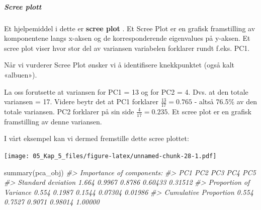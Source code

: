 \documentclass[
]{article}
\newenvironment{Shaded}{\begin{snugshade}}{\end{snugshade}}
\newcommand{\AttributeTok}[1]{\textcolor[rgb]{0.77,0.63,0.00}{#1}}
\newcommand{\CommentTok}[1]{\textcolor[rgb]{0.56,0.35,0.01}{\textit{#1}}}
\newcommand{\DecValTok}[1]{\textcolor[rgb]{0.00,0.00,0.81}{#1}}
\newcommand{\FunctionTok}[1]{\textcolor[rgb]{0.00,0.00,0.00}{#1}}
\newcommand{\NormalTok}[1]{#1}
\newcommand{\OtherTok}[1]{\textcolor[rgb]{0.56,0.35,0.01}{#1}}
\newcommand{\SpecialCharTok}[1]{\textcolor[rgb]{0.00,0.00,0.00}{#1}}
\newcommand{\StringTok}[1]{\textcolor[rgb]{0.31,0.60,0.02}{#1}}
\begin{document}
\hypertarget{scree-plott}{%
\subparagraph{Scree plott}\label{scree-plott}}

Et hjelpemiddel i dette er \textbf{scree plot} \citep{cattellScreeTestNumber1966}. Et Scree Plot er en grafisk framstilling av komponentene langs x-aksen og de korresponderende eigenvalues på y-aksen. Et scree plot viser hvor stor del av variansen variabelen forklarer rundt f.eks. PC1.

Når vi vurderer Scree Plot ønsker vi å identifisere knekkpunktet (også kalt «albuen»).

La oss forutsette at variansen for PC1 = 13 og for PC2 = 4. Dvs. at den totale variansen = 17. Videre beytr det at PC1 forklarer \(\frac{13}{17}=0.765\) - altså 76.5\% av den totale variansen. PC2 forklarer på sin side \(\frac{4}{17}=0.235\). Et scree plot er en grafisk framstilling av denne variansen.

I vårt eksempel kan vi dermed fremstille dette scree plottet:

\begin{Shaded}
\end{Shaded}

\texttt{[image: 05\_Kap\_5\_files/figure-latex/unnamed-chunk-28-1.pdf]}

\begin{Shaded}
\begin{Highlighting}[]
\FunctionTok{summary}\NormalTok{(pca\_obj)}
\CommentTok{\#\textgreater{} Importance of components:}
\CommentTok{\#\textgreater{}                          PC1    PC2    PC3     PC4     PC5}
\CommentTok{\#\textgreater{} Standard deviation     1.664 0.9967 0.8786 0.60433 0.31512}
\CommentTok{\#\textgreater{} Proportion of Variance 0.554 0.1987 0.1544 0.07304 0.01986}
\CommentTok{\#\textgreater{} Cumulative Proportion  0.554 0.7527 0.9071 0.98014 1.00000}
\end{Highlighting}
\end{Shaded}
\end{document}
